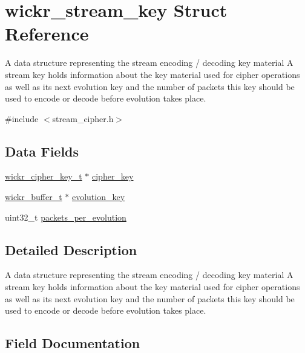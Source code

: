 \hypertarget{structwickr__stream__key}{}\section{wickr\+\_\+stream\+\_\+key Struct Reference}
\label{structwickr__stream__key}


A data structure representing the stream encoding / decoding key material A stream key holds information about the key material used for cipher operations as well as it\textquotesingle{}s next evolution key and the number of packets this key should be used to encode or decode before evolution takes place.  




{\ttfamily \#include $<$stream\+\_\+cipher.\+h$>$}

\subsection*{Data Fields}
\begin{DoxyCompactItemize}
\item 
\hyperlink{structwickr__cipher__key}{wickr\+\_\+cipher\+\_\+key\+\_\+t} $\ast$ \hyperlink{structwickr__stream__key_a3d957a51193dda882cb89ced2ceeb91e}{cipher\+\_\+key}
\item 
\hyperlink{structwickr__buffer}{wickr\+\_\+buffer\+\_\+t} $\ast$ \hyperlink{structwickr__stream__key_ae7210bd67e61cb4c38733a237dae95d9}{evolution\+\_\+key}
\item 
uint32\+\_\+t \hyperlink{structwickr__stream__key_a78777e4c64048b6dae38f8772744194e}{packets\+\_\+per\+\_\+evolution}
\end{DoxyCompactItemize}


\subsection{Detailed Description}
A data structure representing the stream encoding / decoding key material A stream key holds information about the key material used for cipher operations as well as it\textquotesingle{}s next evolution key and the number of packets this key should be used to encode or decode before evolution takes place. 

\subsection{Field Documentation}
\mbox{\label{structwickr__stream__key_a3d957a51193dda882cb89ced2ceeb91e}} 

